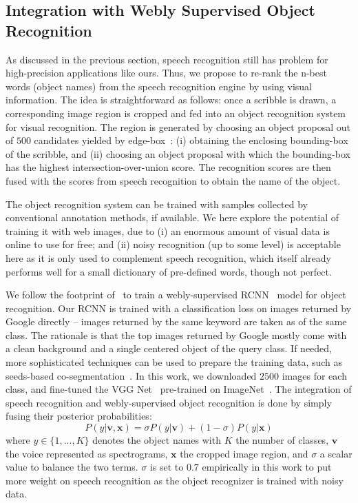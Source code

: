 \subsection{Integration with Webly Supervised Object Recognition}
\label{drawtell:sec:web}
As discussed in the previous section, speech recognition still has problem for high-precision applications like ours. Thus, we propose to re-rank the n-best words (object names) from the speech recognition engine by using visual information. The idea is straightforward as follows: once a scribble is drawn, a corresponding image region is cropped and fed into an object recognition system for visual recognition. The region is generated by choosing an object proposal out of $500$ candidates yielded by edge-box~\citep{edge:box}: (i) obtaining the enclosing bounding-box of the scribble, and (ii) choosing an object proposal with which the bounding-box has the highest intersection-over-union score. 
The recognition scores are then fused with the scores from speech recognition to obtain the name of the object.  %

The object recognition system can be trained with samples collected by conventional annotation methods, if available. We here explore the potential of training it with web images, due to (i) an enormous amount of visual data is online to use for free; and (ii) noisy  recognition (up to some level) is acceptable here as it is only used to complement speech recognition, which itself already performs well for a small dictionary of pre-defined words, though not perfect. 

We follow the footprint of~\citep{webly:cnn} to train a webly-supervised RCNN~\citep{rcnn} model for object recognition. Our RCNN is trained with a classification loss on images returned by Google directly -- images returned by the same keyword are taken as of the same class. The rationale is that the top images returned by Google mostly come with a clean background and a single centered object of the query class.  If needed, more sophisticated techniques can be used to prepare the training data, such as seeds-based co-segmentation~\citep{webly:cnn}.  In this work, we downloaded $2500$ images for each class, and fine-tuned the VGG Net~\citep{vgg16} pre-trained on ImageNet~\citep{imagenet}. The integration of speech recognition and webly-supervised object recognition is done by simply fusing their posterior probabilities: 
\begin{equation}
  P(y | \mathbf{v}, \mathbf{x}) = \sigma  P(y| \mathbf{v}) + (1-\sigma)  P(y|\mathbf{x})
\end{equation}
where $y \in \{1, ..., K \}$ denotes the object names with $K$ the number of classes, $\mathbf{v}$ the voice represented as spectrograms, $\mathbf{x}$ the cropped image region, and $\sigma$ a scalar value to balance the two terms. $\sigma$ is set to $0.7$ empirically in this work to put more weight on speech recognition as the object recognizer is trained with noisy data.      
 

